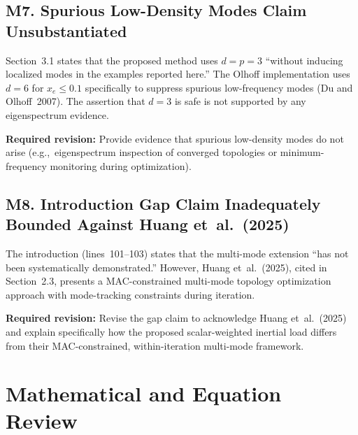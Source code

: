 \documentclass[11pt,a4paper]{article}
\begin{document}
\subsection*{M7.\; Spurious Low-Density Modes Claim Unsubstantiated}

Section~3.1 states that the proposed method uses $d=p=3$ ``without inducing localized
modes in the examples reported here.'' The Olhoff implementation uses $d=6$ for
$x_e\leq0.1$ specifically to suppress spurious low-frequency modes
(Du and Olhoff~2007). The assertion that $d=3$ is safe is not supported by any
eigenspectrum evidence.

\textbf{Required revision:} Provide evidence that spurious low-density modes do not arise
(e.g.,~eigenspectrum inspection of converged topologies or minimum-frequency monitoring
during optimization).

\subsection*{M8.\; Introduction Gap Claim Inadequately Bounded Against Huang et~al.~(2025)}

The introduction (lines~101--103) states that the multi-mode extension ``has not been
systematically demonstrated.'' However, Huang et~al.~(2025), cited in Section~2.3,
presents a MAC-constrained multi-mode topology optimization approach with mode-tracking
constraints during iteration.

\textbf{Required revision:} Revise the gap claim to acknowledge Huang et~al.~(2025) and
explain specifically how the proposed scalar-weighted inertial load differs from their
MAC-constrained, within-iteration multi-mode framework.


\section{Mathematical and Equation Review}
\end{document}
